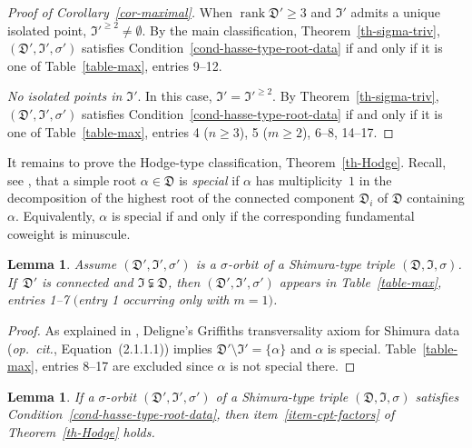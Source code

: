 \documentclass[11pt]{amsart}
\numberwithin{equation}{section}
\newtheorem{lemma}[theorem]{Lemma}
\theoremstyle{definition}
\theoremstyle{remark}
\newcommand{\Dfr}{{\mathfrak D}}
\newcommand{\Ifr}{{\mathfrak I}}
\DeclareMathOperator{\rank}{rank}
\newcommand{\opcitn}{{\em op.\ cit.}}
\begin{document}
\begin{proof}[Proof of Corollary~\ref{cor-maximal}]
When $\rank \Dfr' \geq 3$ and $\Ifr'$ admits a unique isolated point, $\Ifr'^{\geq 2} \neq \emptyset$. 
By the main classification, Theorem~\ref{th-sigma-triv}, $(\Dfr', \Ifr', \sigma')$ satisfies Condition~\ref{cond-hasse-type-root-data} if and only if it is one of Table~\ref{table-max}, entries 9--12. 

\textit{No isolated points in $\Ifr'$}. In this case, $\Ifr'=\Ifr'^{\geq 2}$. By Theorem~\ref{th-sigma-triv}, $(\Dfr', \Ifr', \sigma')$ satisfies Condition~\ref{cond-hasse-type-root-data} if and only if it is one of Table~\ref{table-max}, entries 4 ($n \geq 3$), 5 ($m \geq 2$), 6--8,  14--17.
\end{proof}
It remains to prove the Hodge-type classification, Theorem~\ref{th-Hodge}.
Recall, see \cite[Section~1.2.5]{Deligne-Shimura-varieties}, that a simple root $\alpha \in \Dfr$ is \emph{special} if $\alpha$ has multiplicity~$1$ in the decomposition of the highest root of the connected component $\Dfr_i$ of $\Dfr$ containing $\alpha$. Equivalently, $\alpha$ is special if and only if the corresponding fundamental coweight is minuscule.

\begin{lemma}
\label{lem-Hodge-simple}
Assume $(\Dfr', \Ifr', \sigma')$ is a $\sigma$-orbit of a Shimura-type triple $(\Dfr, \Ifr, \sigma)$. If\, $\Dfr'$ is connected and $\Ifr \subsetneqq \Dfr$, then $(\Dfr', \Ifr', \sigma')$ appears in Table~\ref{table-max}, entries 1--7 $($entry 1 occurring only with $m=1)$.
\end{lemma}

\begin{proof}
As explained in \cite[Section~1.2.5]{Deligne-Shimura-varieties}, Deligne's Griffiths transversality axiom for Shimura data (\opcitn, Equation~(2.1.1.1)) implies $\Dfr'\setminus \Ifr'= \{\alpha\}$ and  $\alpha$ is special. Table~\ref{table-max}, entries 8--17 are excluded since $\alpha$ is not special there.
\end{proof}

\begin{lemma}
\label{lem-Hodge-cpt-factors}
If a $\sigma$-orbit $(\Dfr', \Ifr', \sigma')$ of a Shimura-type triple $(\Dfr, \Ifr, \sigma)$ satisfies Condition~\ref{cond-hasse-type-root-data}, then item~\eqref{item-cpt-factors} of Theorem~\ref{th-Hodge} holds. 
\end{lemma}
\end{document}
